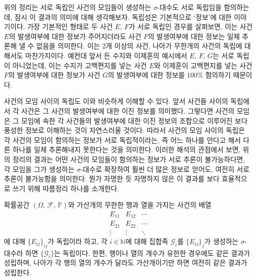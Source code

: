 위의 정리는 서로 독립인 사건의 모임들이 생성하는 $\sigma$-대수도 서로 독립임을 함의하는데, 잠시 이 결과의 의미에 대해 생각해보자. 독립성은 기본적으로 `정보'에 대한 이야기이다. 가장 기본적인 형태로 두 사건 $E,\,F$가 서로 독립인 경우를 살펴보면, 이는 사건 $E$의 발생여부에 대한 정보가 주어지더라도 사건 $F$의 발생여부에 대한 정보는 일체 추론해 낼 수 없음을 의미한다. 이는 2개 이상의 사건, 나아가 무한개의 사건의 독립에 대해서도 마찬가지이다. 예컨대 앞서 든 수지와 이제훈의 예시에서 $E,\,F,\,G$는 서로 독립이 아니었는데, 이는 수지가 고백편지를 넣는 사건 $E$와 이제훈이 고백편지를 넣는 사건 $F$의 발생여부에 대한 정보가 사건 $G$의 발생여부에 대한 정보를 100\% 함의하기 때문이다.

사건의 모임 사이의 독립도 이와 비슷하게 이해할 수 있다. 앞서 사건들 사이의 독립에서 각 사건은 그 사건의 발생여부에 대한 이진 정보를 의미했다. 그렇다면 사건의 모임은 그 모임에 속한 각 사건들의 발생여부에 대한 이진 정보의 조합으로 이루어진 보다 풍성한 정보로 이해하는 것이 자연스러울 것이다. 따라서 사건의 모임 사이의 독립은 각 사건의 모임이 함의하는 정보가 서로 독립적이라는, 즉 어느 하나를 안다고 해서 다른 하나를 일체 추론해내지 못한다는 것을 의미한다. 이러한 해석의 관점에서 보면, 위의 정리의 결과는 어떤 사건의 모임들이 함의하는 정보가 서로 추론이 불가능하다면, 각 모임을 그가 생성하는 $\sigma$-대수로 확장하여 훨씬 더 많은 정보로 얻어도, 여전히 서로 추론이 불가능함을 의미한다. 뭔가 자명한 듯 자명하지 않은 이 결과를 보다 효율적으로 쓰기 위해 따름정리 하나를 소개한다.

\begin{corollary}\label{cor:independence}
    확률공간 $(\Omega,\,\mathcal{F},\,\mathbb{P})$와 가산개의 무한한 행과 열을 가지는 사건의 배열
    \begin{equation*}
        \begin{matrix}
            E_{11}&E_{12}&\cdots\\
            E_{21}&E_{22}&\cdots\\
            \vdots&\vdots&\ddots
        \end{matrix}
    \end{equation*}
    에 대해 $\{E_{ij}\}_{ij}$가 독립이라 하고, 각 $i\in\mathbb{N}$에 대해 집합족 $\mathcal{G}_i$를 $\{E_{ij}\}_j$가 생성하는 $\sigma$-대수라 하면 $\{\mathcal{G}_i\}$는 독립이다. 한편, 행이나 열의 개수가 유한한 경우에도 같은 결과가 성립하며, 나아가 각 행의 열의 개수가 달라도 가산개이기만 하면 여전히 같은 결과가 성립한다.
\end{corollary}


